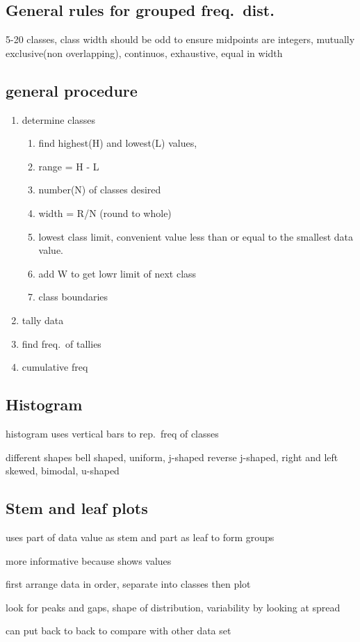 \documentclass[11pt]{article}
\begin{document}
\subsection{General rules for grouped freq.\ dist.}
\par 5-20 classes, class width should be odd to ensure midpoints are
integers, mutually exclusive(non overlapping), continuos, exhaustive,
equal in width
\subsection{general procedure}
\begin{enumerate}
  \item determine classes
    \begin{enumerate}
      \item find highest(H) and lowest(L) values,
      \item range = H - L
      \item number(N) of classes desired
      \item width =  R/N (round to whole)
      \item lowest class limit, convenient value less than or equal to the
        smallest data value.
      \item add W to get lowr limit of next class
      \item class boundaries
    \end{enumerate}
  \item tally data
  \item find freq.\ of tallies
  \item cumulative freq
\end{enumerate}
\subsection{Histogram}
\par histogram uses vertical bars to rep.\ freq of classes
\par different shapes bell shaped, uniform, j-shaped
reverse j-shaped, right and left skewed, bimodal, u-shaped
\subsection{Stem and leaf plots}
\par uses part of data value as stem and part as leaf to form groups
\par more informative because shows values
\par first arrange data in order, separate into classes then plot
\par look for peaks and gaps, shape of distribution, variability by looking
at spread
\par can put back to back to compare with other data set
\end{document}
